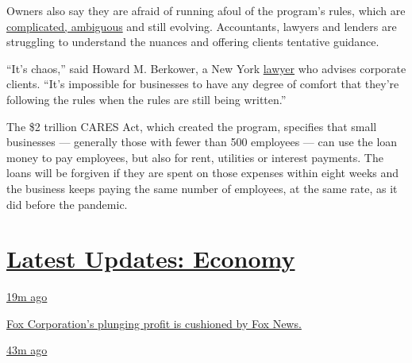 Owners also say they are afraid of running afoul of the program's rules,
which are
\href{https://www.rklcpa.com/ppp-loan-forgiveness-known-unknown-action-items/}{complicated,
ambiguous} and still evolving. Accountants, lawyers and lenders are
struggling to understand the nuances and offering clients tentative
guidance.

``It's chaos,'' said Howard M. Berkower, a New York
\href{https://www.mccarter.com/people/howard-m-berkower/}{lawyer} who
advises corporate clients. ``It's impossible for businesses to have any
degree of comfort that they're following the rules when the rules are
still being written.''

The \$2 trillion CARES Act, which created the program, specifies that
small businesses --- generally those with fewer than 500 employees ---
can use the loan money to pay employees, but also for rent, utilities or
interest payments. The loans will be forgiven if they are spent on those
expenses within eight weeks and the business keeps paying the same
number of employees, at the same rate, as it did before the pandemic.

\hypertarget{latest-updates-economy}{%
\section{\texorpdfstring{\href{https://www.nytimes3xbfgragh.onion/live/2020/08/04/business/stock-market-today-coronavirus?action=click\&pgtype=Article\&state=default\&region=MAIN_CONTENT_1\&context=storylines_live_updates}{Latest
Updates:
Economy}}{Latest Updates: Economy}}\label{latest-updates-economy}}

\href{https://www.nytimes3xbfgragh.onion/live/2020/08/04/business/stock-market-today-coronavirus?action=click\&pgtype=Article\&state=default\&region=MAIN_CONTENT_1\&context=storylines_live_updates\#fox-corporations-plunging-profit-is-cushioned-by-fox-news}{19m
ago}

\href{https://www.nytimes3xbfgragh.onion/live/2020/08/04/business/stock-market-today-coronavirus?action=click\&pgtype=Article\&state=default\&region=MAIN_CONTENT_1\&context=storylines_live_updates\#fox-corporations-plunging-profit-is-cushioned-by-fox-news}{Fox
Corporation's plunging profit is cushioned by Fox News.}

\href{https://www.nytimes3xbfgragh.onion/live/2020/08/04/business/stock-market-today-coronavirus?action=click\&pgtype=Article\&state=default\&region=MAIN_CONTENT_1\&context=storylines_live_updates\#trading-in-kodak-shares-comes-under-scrutiny}{43m
ago}

